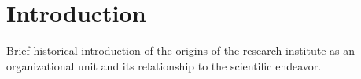\section{Introduction}
Brief historical introduction of the origins of the research institute as an organizational unit and its relationship to the scientific endeavor. 